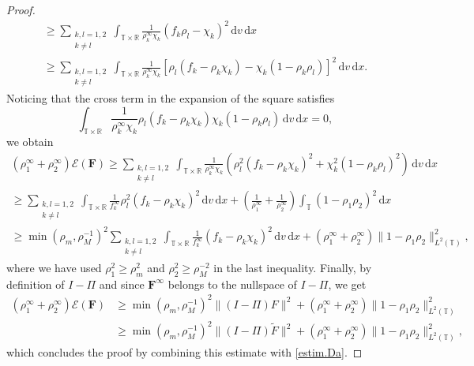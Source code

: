 \documentclass[10pt,a4paper]{amsart}
\newcommand{\Fbf}{\mathbf{F}}
\newcommand{\Ft}{{\widetilde{F}}}
\newcommand{\R}{\mathbb{R}}
\newcommand{\T}{\mathbb{T}}
\newcommand{\dd}{\,\mathrm{d}}
\begin{document}
\begin{proof}
\begin{gather*}
\geq \sum_{\substack{k,l=1,2\\ k\neq l}}\int_{\T\times\R}\frac{1}{\rho_k^\infty\chi_k}(f_k\rho_l-\chi_k)^2\dd v\dd x\\
\geq \sum_{\substack{k,l=1,2\\ k\neq l}}\int_{\T\times\R}\frac{1}{\rho_k^\infty\chi_k}\left[\rho_l(f_k-\rho_k\chi_k)-\chi_k(1-\rho_k\rho_l)\right]^2\dd v\dd x.
\end{gather*}
Noticing that the cross term in the expansion of the square satisfies
\[ \int_{\T\times\R}\frac{1}{\rho_k^\infty\chi_k}\rho_l(f_k-\rho_k\chi_k)\chi_k(1-\rho_k\rho_l)\dd v\dd x =0,\]
we obtain
\begin{gather*}
(\rho_1^\infty+\rho_2^\infty)\mathcal{E}(\Fbf) \geq  \sum_{\substack{k,l=1,2\\ k\neq l}}\int_{\T\times\R}\frac{1}{\rho_k^\infty\chi_k}\left(\rho_l^2(f_k-\rho_k\chi_k)^2+\chi_k^2(1-\rho_k\rho_l)^2\right)\dd v\dd x\\
\geq  \sum_{\substack{k,l=1,2\\ k\neq l}}\int_{\T\times\R}\frac{1}{f_k^\infty}\rho_l^2(f_k-\rho_k\chi_k)^2\dd v\dd x+\left(\frac{1}{\rho_1^\infty}+\frac{1}{\rho_2^\infty}\right)\int_\T (1-\rho_1\rho_2)^2\dd x \\
\geq \min(\rho_m,\rho_M^{-1})^2 \sum_{\substack{k,l=1,2\\ k\neq l}}\int_{\T\times\R}\frac{1}{f_k^\infty}(f_k-\rho_k\chi_k)^2\dd v\dd x+(\rho_1^\infty+\rho_2^\infty)\|1-\rho_1\rho_2\|_{L^2(\T)}^2,
\end{gather*}
where we have used $\rho_1^2\geq \rho_m^2$ and $\rho_2^2\geq \rho_M^{-2}$ in the last inequality. Finally, by definition of $I-\Pi$ and since $\Fbf^\infty$ belongs to the nullspace of $I-\Pi$, we get
\begin{align*}
(\rho_1^\infty+\rho_2^\infty)\mathcal{E}(\Fbf) &\geq \min(\rho_m,\rho_M^{-1})^2\|(I-\Pi)F\|^2+(\rho_1^\infty+\rho_2^\infty)\|1-\rho_1\rho_2\|_{L^2(\T)}^2\\
&\geq \min(\rho_m,\rho_M^{-1})^2\|(I-\Pi)\Ft\|^2+(\rho_1^\infty+\rho_2^\infty)\|1-\rho_1\rho_2\|_{L^2(\T)}^2,
\end{align*}
which concludes the proof by combining this estimate with \eqref{estim.Da}.
\end{proof}
\end{document}
